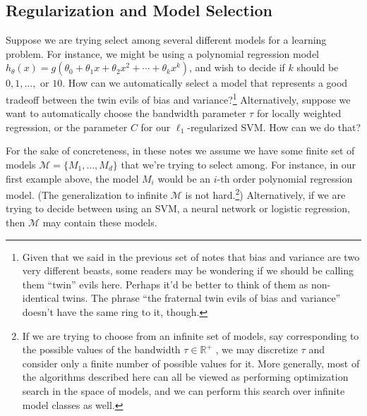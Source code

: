 \titlespacing*{\part}{0pt}{-20pt}{30pt} %
\titlespacing*{\chapter}{0pt}{-10pt}{30pt}

\begin{fullwidth}
\part{Regularization and Model Selection}
\label{part:regularization}
\end{fullwidth}


Suppose we are trying select among several different models for a learning
problem. For instance, we might be using a polynomial regression model
$h_\theta (x) = g(\theta_0 + \theta_1 x + \theta_2 x^2 + \cdots + \theta_k x^k)$, and wish to decide if $k$ should be
$0, 1, \ldots,$ or $10$. How can we automatically select a model that represents a
good tradeoff between the twin evils of bias and variance?\footnote{
Given that we said in the previous set of notes that bias and variance are two very
different beasts, some readers may be wondering if we should be calling them ``twin'' evils
here. Perhaps it'd be better to think of them as non-identical twins. The phrase ``the
fraternal twin evils of bias and variance'' doesn't have the same ring to it, though.} Alternatively,
suppose we want to automatically choose the bandwidth parameter $\tau$ for
locally weighted regression, or the parameter $C$ for our $\ell_1$-regularized SVM.
How can we do that?

For the sake of concreteness, in these notes we assume we have some
finite set of models $\mathcal M = \{M_1 ,\ldots ,M_d\}$ that we're trying to select among.
For instance, in our first example above, the model $M_i$ would be an $i$-th
order polynomial regression model. (The generalization to infinite $\mathcal M$ is not
hard.\footnote{
If we are trying to choose from an infinite set of models, say corresponding to the
possible values of the bandwidth $\tau \in \mathbb R^+$ , we may discretize $\tau$ and consider only a finite
number of possible values for it. More generally, most of the algorithms described here
can all be viewed as performing optimization search in the space of models, and we can
perform this search over infinite model classes as well.}) Alternatively, if we are trying to decide between using an SVM, a
neural network or logistic regression, then $\mathcal M$ may contain these models.


